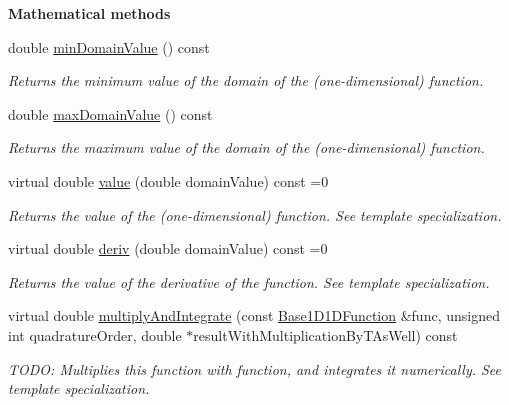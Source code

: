 \begin{Indent}{\bf Mathematical methods}\par
\begin{DoxyCompactItemize}
\item 
double \hyperlink{class_q_u_e_s_o_1_1_base1_d1_d_function_a4c110e621ef1ac557bbcc60d41f5a3c2}{min\-Domain\-Value} () const 
\begin{DoxyCompactList}\small\item\em Returns the minimum value of the domain of the (one-\/dimensional) function. \end{DoxyCompactList}\item 
double \hyperlink{class_q_u_e_s_o_1_1_base1_d1_d_function_ad2b80d0c52c0cb56c89f70f30b3bb19e}{max\-Domain\-Value} () const 
\begin{DoxyCompactList}\small\item\em Returns the maximum value of the domain of the (one-\/dimensional) function. \end{DoxyCompactList}\item 
virtual double \hyperlink{class_q_u_e_s_o_1_1_base1_d1_d_function_a1042dfd930c30a35d6dbf70f94e8dfe5}{value} (double domain\-Value) const =0
\begin{DoxyCompactList}\small\item\em Returns the value of the (one-\/dimensional) function. See template specialization. \end{DoxyCompactList}\item 
virtual double \hyperlink{class_q_u_e_s_o_1_1_base1_d1_d_function_a6b8de03f2099f31735dcaf15c24bca32}{deriv} (double domain\-Value) const =0
\begin{DoxyCompactList}\small\item\em Returns the value of the derivative of the function. See template specialization. \end{DoxyCompactList}\item 
virtual double \hyperlink{class_q_u_e_s_o_1_1_base1_d1_d_function_ac41e4e15b7f97c14a0389069bf8e833d}{multiply\-And\-Integrate} (const \hyperlink{class_q_u_e_s_o_1_1_base1_d1_d_function}{Base1\-D1\-D\-Function} \&func, unsigned int quadrature\-Order, double $\ast$result\-With\-Multiplication\-By\-T\-As\-Well) const 
\begin{DoxyCompactList}\small\item\em T\-O\-D\-O\-: Multiplies {\ttfamily this} function with {\ttfamily function}, and integrates it numerically. See template specialization. \end{DoxyCompactList}\end{DoxyCompactItemize}
\end{Indent}
